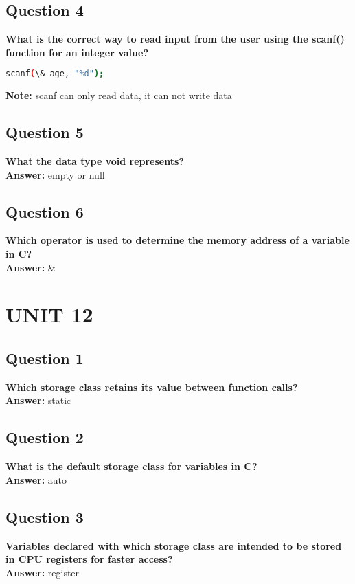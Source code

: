 \documentclass[11pt,parskip]{scrartcl}
\begin{document}
\subsection*{Question 4} 
\textbf{What is the correct way to read input from the user using the scanf() function for an integer value?} \\
\begin{lstlisting}[language=bash]
scanf(\& age, "%d");
\end{lstlisting}
\textbf{Note:} scanf can only read data, it can not write data


\subsection*{Question 5} 
\textbf{What the data type void represents?} \\
\textbf{Answer:} empty or null

\subsection*{Question 6}
\textbf{Which operator is used to determine the memory address of a variable in C?} \\
\textbf{Answer:} \&

\section*{UNIT 12}

\subsection*{Question 1}
\textbf{Which storage class retains its value between function calls?} \\
\textbf{Answer:} static

\subsection*{Question 2}
\textbf{What is the default storage class for variables in C?} \\
\textbf{Answer:} auto

\subsection*{Question 3}
\textbf{Variables declared with which storage class are intended to be stored in CPU registers for faster access?} \\
\textbf{Answer:} register
\end{document}
